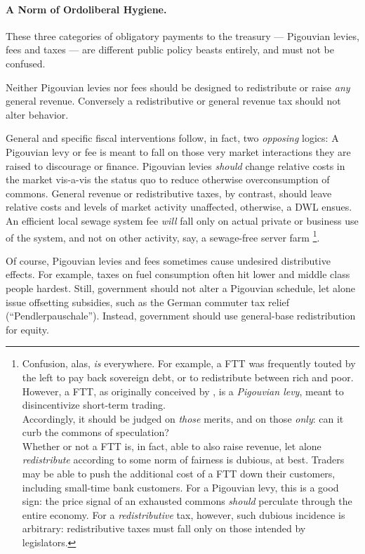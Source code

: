 \paragraph[Ordoliberal Hygiene]{A Norm of Ordoliberal Hygiene.}  \label{sec:ordoliberalhygiene} These three categories of obligatory payments to the treasury --- Pigouvian levies, fees and taxes --- are different public policy beasts entirely, and must not be confused.

Neither Pigouvian levies nor fees should be designed to redistribute or raise \emph{any} general revenue. Conversely a redistributive or general revenue tax should not alter behavior. 

General and specific fiscal interventions follow, in fact, two \emph{opposing} logics: A Pigouvian levy or fee is meant to fall on those very market interactions they are raised to discourage or finance. Pigouvian levies \emph{should} change relative costs in the market vis-a-vis the status quo to reduce otherwise overconsumption of commons. General revenue or redistributive taxes, by contrast, should leave relative costs and levels of market activity unaffected, otherwise, a \gls{DWL} ensues. An efficient local sewage system fee \emph{will} fall only on actual private or business use of the system, and not on other activity, say, a sewage-free server farm \footnote{
	Confusion, alas, \emph{is} everywhere. For example, a \gls{FTT} was frequently touted by the left to pay back sovereign debt, or to redistribute between rich and poor. However, a \gls{FTT}, as originally conceived by \cite{Tobin1970}, is a \emph{Pigouvian levy}, meant to disincentivize short-term trading. \\ 
	Accordingly, it should be judged on \emph{those} merits, and on those \emph{only}: can it curb the commons of speculation? \\ 
	Whether or not a \gls{FTT} is, in fact, able to also raise revenue, let alone \emph{redistribute} according to some norm of fairness is dubious, at best. Traders may be able to push the additional cost of a \gls{FTT} down their customers, including small-time bank customers. For a Pigouvian levy, this is a good sign: the price signal of an exhausted commons \emph{should} perculate through the entire economy. For a \emph{redistributive} tax, however, such dubious incidence is arbitrary: redistributive taxes must fall only on those intended by legislators.}.

Of course, Pigouvian levies and fees sometimes cause undesired distributive effects. For example, taxes on fuel consumption often hit lower and middle class people hardest. Still, government should not alter a Pigouvian schedule, let alone issue offsetting subsidies, such as the German commuter tax relief (``Pendlerpauschale''). Instead, government should use general-base redistribution for equity.

